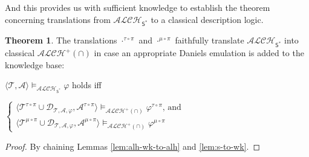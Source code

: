 \documentclass[letterpaper]{article} %
\theoremstyle{definition}
\theoremstyle{definition}
\theoremstyle{definition}
\newtheorem{theorem}{Theorem}
\theoremstyle{definition}
\theoremstyle{definition}
\begin{document}
\noindent And this provides us with sufficient knowledge to establish the theorem concerning translations from $\mathcal{ALCH}_{\mathsf{S}^*}$ to a classical description logic.

\begin{theorem}
    The translations $\cdot^{\tau\circ \pi}$ and $\cdot^{\mu\circ \pi}$ faithfully translate $\mathcal{ALCH}_{\mathsf{S}^*}$ into classical $\mathcal{ALCH}^+(\cap)$ in case an appropriate Daniels emulation is added to the knowledge base:

    \begin{center}
        $\langle\mathcal{T},\mathcal{A}\rangle\vDash_{\mathcal{ALCH}_{\mathsf{S}^{\ast}}}\varphi$ holds iff
        
        $\begin{cases}
    \langle\mathcal{T}^{\tau\circ\pi}\cup\mathcal{D}_{\mathcal{T},\mathcal{A},\varphi},\mathcal{A}^{\tau\circ\pi}\rangle\vDash_{\mathcal{ALCH^+(\cap)}}\varphi^{\tau\circ\pi} \mbox{, and}\\
    \langle\mathcal{T}^{\mu\circ\pi}\cup\mathcal{D}_{\mathcal{T},\mathcal{A},\varphi},\mathcal{A}^{\mu\circ\pi}\rangle\vDash_{\mathcal{ALCH^+(\cap)}}\varphi^{\mu\circ\pi}
    
    \end{cases}$
    \end{center}
\end{theorem}

\begin{proof}
    By chaining Lemmas  \ref{lem:alh-wk-to-alh} and \ref{lem:s-to-wk}.
\end{proof}
\end{document}

